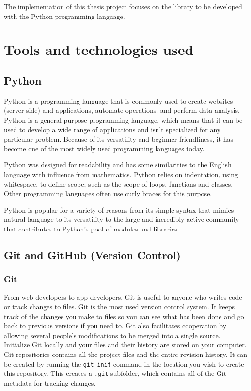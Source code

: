 The implementation of this thesis project focuses on the library to be developed with the Python programming language.
\section{Tools and technologies used}
\subsection{Python}
Python is a programming language that is commonly used to create websites (server-side) and applications, automate operations, and perform data analysis. Python is a general-purpose programming language, which means that it can be used to develop a wide range of applications and isn't specialized for any particular problem. Because of its versatility and beginner-friendliness, it has become one of the most widely used programming languages today.

Python was designed for readability and has some similarities to the English language with influence from mathematics. Python relies on indentation, using whitespace, to define scope; such as the scope of loops, functions and classes. Other programming languages often use curly braces for this purpose.

Python is popular for a variety of reasons from its simple syntax that mimics natural language to its versatility to the large and incredibly active community that contributes to Python’s pool of modules and libraries.

\subsection{Git and GitHub (Version Control)}
\subsubsection{Git}
From web developers to app developers, Git is useful to anyone who writes code or track changes to files. Git is the most used version control system. It keeps track of the changes you make to files so you can see what has been done and go back to previous versions if you need to. Git also facilitates cooperation by allowing several people's modifications to be merged into a single source. Initialize Git locally and your files and their history are stored on your computer. Git repositories contains all the project files and the entire revision history. It can be created by running the \verb+git init+ command in the location you wish to create this repository. This creates a \verb+.git+ subfolder, which contains all of the Git metadata for tracking changes.

